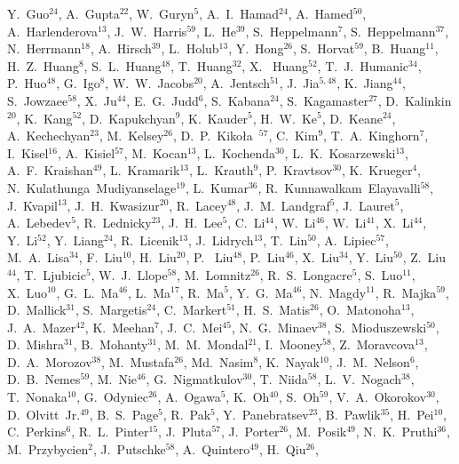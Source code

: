 \documentclass[%
 reprint,	
 amsmath,amssymb,
 aps,
 prc,
]{revtex4-1}
\begin{document}
{Y.~Guo$^{24}$,
A.~Gupta$^{22}$,
W.~Guryn$^{5}$,
A.~I.~Hamad$^{24}$,
A.~Hamed$^{50}$,
A.~Harlenderova$^{13}$,
J.~W.~Harris$^{59}$,
L.~He$^{39}$,
S.~Heppelmann$^{7}$,
S.~Heppelmann$^{37}$,
N.~Herrmann$^{18}$,
A.~Hirsch$^{39}$,
L.~Holub$^{13}$,
Y.~Hong$^{26}$,
S.~Horvat$^{59}$,
B.~Huang$^{11}$,
H.~Z.~Huang$^{8}$,
S.~L.~Huang$^{48}$,
T.~Huang$^{32}$,
X.~ Huang$^{52}$,
T.~J.~Humanic$^{34}$,
P.~Huo$^{48}$,
G.~Igo$^{8}$,
W.~W.~Jacobs$^{20}$,
A.~Jentsch$^{51}$,
J.~Jia$^{5,48}$,
K.~Jiang$^{44}$,
S.~Jowzaee$^{58}$,
X.~Ju$^{44}$,
E.~G.~Judd$^{6}$,
S.~Kabana$^{24}$,
S.~Kagamaster$^{27}$,
D.~Kalinkin$^{20}$,
K.~Kang$^{52}$,
D.~Kapukchyan$^{9}$,
K.~Kauder$^{5}$,
H.~W.~Ke$^{5}$,
D.~Keane$^{24}$,
A.~Kechechyan$^{23}$,
M.~Kelsey$^{26}$,
D.~P.~Kiko\l{}a~$^{57}$,
C.~Kim$^{9}$,
T.~A.~Kinghorn$^{7}$,
I.~Kisel$^{16}$,
A.~Kisiel$^{57}$,
M.~Kocan$^{13}$,
L.~Kochenda$^{30}$,
L.~K.~Kosarzewski$^{13}$,
A.~F.~Kraishan$^{49}$,
L.~Kramarik$^{13}$,
L.~Krauth$^{9}$,
P.~Kravtsov$^{30}$,
K.~Krueger$^{4}$,
N.~Kulathunga~Mudiyanselage$^{19}$,
L.~Kumar$^{36}$,
R.~Kunnawalkam~Elayavalli$^{58}$,
J.~Kvapil$^{13}$,
J.~H.~Kwasizur$^{20}$,
R.~Lacey$^{48}$,
J.~M.~Landgraf$^{5}$,
J.~Lauret$^{5}$,
A.~Lebedev$^{5}$,
R.~Lednicky$^{23}$,
J.~H.~Lee$^{5}$,
C.~Li$^{44}$,
W.~Li$^{46}$,
W.~Li$^{41}$,
X.~Li$^{44}$,
Y.~Li$^{52}$,
Y.~Liang$^{24}$,
R.~Licenik$^{13}$,
J.~Lidrych$^{13}$,
T.~Lin$^{50}$,
A.~Lipiec$^{57}$,
M.~A.~Lisa$^{34}$,
F.~Liu$^{10}$,
H.~Liu$^{20}$,
P.~ Liu$^{48}$,
P.~Liu$^{46}$,
X.~Liu$^{34}$,
Y.~Liu$^{50}$,
Z.~Liu$^{44}$,
T.~Ljubicic$^{5}$,
W.~J.~Llope$^{58}$,
M.~Lomnitz$^{26}$,
R.~S.~Longacre$^{5}$,
S.~Luo$^{11}$,
X.~Luo$^{10}$,
G.~L.~Ma$^{46}$,
L.~Ma$^{17}$,
R.~Ma$^{5}$,
Y.~G.~Ma$^{46}$,
N.~Magdy$^{11}$,
R.~Majka$^{59}$,
D.~Mallick$^{31}$,
S.~Margetis$^{24}$,
C.~Markert$^{51}$,
H.~S.~Matis$^{26}$,
O.~Matonoha$^{13}$,
J.~A.~Mazer$^{42}$,
K.~Meehan$^{7}$,
J.~C.~Mei$^{45}$,
N.~G.~Minaev$^{38}$,
S.~Mioduszewski$^{50}$,
D.~Mishra$^{31}$,
B.~Mohanty$^{31}$,
M.~M.~Mondal$^{21}$,
I.~Mooney$^{58}$,
Z.~Moravcova$^{13}$,
D.~A.~Morozov$^{38}$,
M.~Mustafa$^{26}$,
Md.~Nasim$^{8}$,
K.~Nayak$^{10}$,
J.~M.~Nelson$^{6}$,
D.~B.~Nemes$^{59}$,
M.~Nie$^{46}$,
G.~Nigmatkulov$^{30}$,
T.~Niida$^{58}$,
L.~V.~Nogach$^{38}$,
T.~Nonaka$^{10}$,
G.~Odyniec$^{26}$,
A.~Ogawa$^{5}$,
K.~Oh$^{40}$,
S.~Oh$^{59}$,
V.~A.~Okorokov$^{30}$,
D.~Olvitt~Jr.$^{49}$,
B.~S.~Page$^{5}$,
R.~Pak$^{5}$,
Y.~Panebratsev$^{23}$,
B.~Pawlik$^{35}$,
H.~Pei$^{10}$,
C.~Perkins$^{6}$,
R.~L.~Pinter$^{15}$,
J.~Pluta$^{57}$,
J.~Porter$^{26}$,
M.~Posik$^{49}$,
N.~K.~Pruthi$^{36}$,
M.~Przybycien$^{2}$,
J.~Putschke$^{58}$,
A.~Quintero$^{49}$,
H.~Qiu$^{26}$,
}
\end{document}
